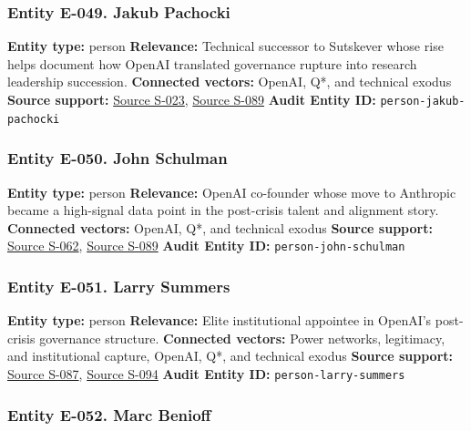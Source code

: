 \documentclass[
  american,
  11pt,
  letterpaper,
]{article}
\begin{document}
\subsubsection{Entity E-049. Jakub
Pachocki}\label{entity-e-049-jakub-pachocki}

\textbf{Entity type:} person \textbf{Relevance:} Technical successor to
Sutskever whose rise helps document how OpenAI translated governance
rupture into research leadership succession. \textbf{Connected vectors:}
OpenAI, Q*, and technical exodus \textbf{Source support:}
\hyperref[source-s-023-openai-co-founder-ilya-sutskever-announces-departure-from-chatgpt-maker]{Source
S-023},
\hyperref[source-s-089-openai-board-forms-safety-and-security-committee]{Source
S-089} \textbf{Audit Entity ID:} \texttt{person-jakub-pachocki}

\subsubsection{Entity E-050. John
Schulman}\label{entity-e-050-john-schulman}

\textbf{Entity type:} person \textbf{Relevance:} OpenAI co-founder whose
move to Anthropic became a high-signal data point in the post-crisis
talent and alignment story. \textbf{Connected vectors:} OpenAI, Q*, and
technical exodus \textbf{Source support:}
\hyperref[source-s-062-openai-co-founder-departs-for-rival-anthropic]{Source
S-062},
\hyperref[source-s-089-openai-board-forms-safety-and-security-committee]{Source
S-089} \textbf{Audit Entity ID:} \texttt{person-john-schulman}

\subsubsection{Entity E-051. Larry
Summers}\label{entity-e-051-larry-summers}

\textbf{Entity type:} person \textbf{Relevance:} Elite institutional
appointee in OpenAI's post-crisis governance structure.
\textbf{Connected vectors:} Power networks, legitimacy, and
institutional capture, OpenAI, Q*, and technical exodus \textbf{Source
support:}
\hyperref[source-s-087-sam-altman-returns-as-ceo-openai-has-a-new-initial-board]{Source
S-087},
\hyperref[source-s-094-openai-announces-new-members-to-board-of-directors]{Source
S-094} \textbf{Audit Entity ID:} \texttt{person-larry-summers}

\subsubsection{Entity E-052. Marc
Benioff}\label{entity-e-052-marc-benioff}
\end{document}
